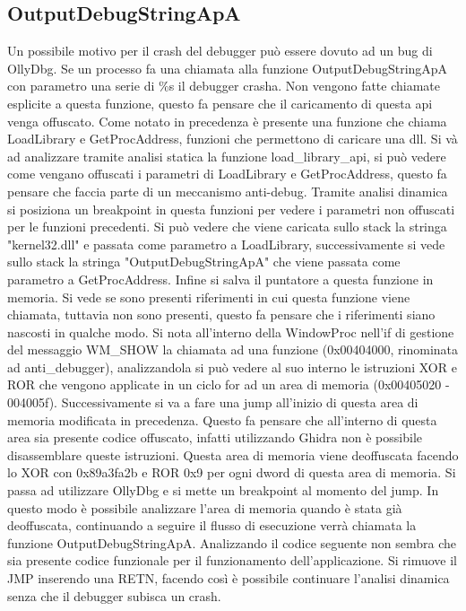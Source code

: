 \documentclass[a4paper,12pt]{article}
\begin{document}
\subsection{OutputDebugStringApA}
Un possibile motivo per il crash del debugger può essere dovuto ad un bug di OllyDbg. Se un processo fa una chiamata alla funzione OutputDebugStringApA con parametro una serie di \%s il debugger crasha. Non vengono fatte chiamate esplicite a questa funzione, questo fa pensare che il caricamento di questa api venga offuscato. Come notato in precedenza è presente una funzione che chiama LoadLibrary e GetProcAddress, funzioni che permettono di caricare una dll. Si và ad analizzare tramite analisi statica la funzione load\_library\_api, si può vedere come vengano offuscati i parametri di LoadLibrary e GetProcAddress, questo fa pensare che faccia parte di un meccanismo anti-debug. Tramite analisi dinamica si posiziona un breakpoint in questa funzioni per vedere i parametri non offuscati per le funzioni precedenti. Si può vedere che viene caricata  sullo stack la stringa "kernel32.dll" e passata come parametro a LoadLibrary, successivamente si vede sullo stack la stringa "OutputDebugStringApA" che viene passata come parametro a GetProcAddress. Infine si salva il puntatore a questa funzione in memoria. Si vede se sono presenti riferimenti in cui questa funzione viene chiamata, tuttavia non sono presenti, questo fa pensare che i riferimenti siano nascosti in qualche modo.  Si nota all'interno della WindowProc nell'if di gestione  del messaggio WM\_SHOW la chiamata ad una funzione (0x00404000, rinominata ad anti\_debugger), analizzandola si può vedere al suo interno le istruzioni XOR e ROR che vengono applicate in un ciclo for ad un area di memoria (0x00405020 - 004005f).
 Successivamente si va a fare una jump all'inizio di questa area di memoria modificata in precedenza. Questo fa pensare che all'interno di questa area sia presente codice offuscato, infatti utilizzando Ghidra non è possibile disassemblare queste istruzioni.  Questa area di memoria viene deoffuscata facendo lo XOR con 0x89a3fa2b e ROR 0x9 per ogni dword di questa area di memoria.
 Si passa ad utilizzare OllyDbg e si mette un breakpoint al momento del jump. In questo modo è possibile analizzare l'area di memoria quando è stata già deoffuscata, continuando a seguire il flusso di esecuzione verrà chiamata la funzione OutputDebugStringApA. Analizzando il codice seguente non sembra che sia presente codice funzionale per il funzionamento dell'applicazione. Si rimuove il JMP inserendo una RETN, facendo così è possibile continuare l'analisi dinamica senza che il debugger subisca un crash.
\end{document}
